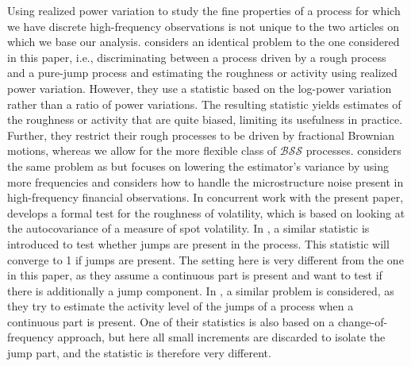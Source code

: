 \documentclass[fleqn,11pt,letterpaper]{article}
\theoremstyle{plain}
\theoremstyle{definition}
\theoremstyle{remark}
\numberwithin{equation}{section}
\begin{document}
Using realized power variation to study the fine properties of a process for which we have discrete high-frequency observations is not unique to the two articles on which we base our analysis. \cite{Woener2011} considers an identical problem to the one considered in this paper, i.e., discriminating between a process driven by a rough process and a pure-jump process and estimating the roughness or activity using realized power variation. However, they use a statistic based on the log-power variation rather than a ratio of power variations. The resulting statistic yields estimates of the roughness or activity that are quite biased, limiting its usefulness in practice. Further, they restrict their rough processes to be driven by fractional Brownian motions, whereas we allow for the more flexible class of $\mathcal{BSS}$ processes.%
\cite{Bennedsen2020} considers the same problem as \cite{Corcuera2013} but focuses on lowering the estimator's variance by using more frequencies and considers how to handle the microstructure noise present in high-frequency financial observations. In concurrent work with the present paper, \cite{ChongTodorov2023} develops a formal test for the roughness of volatility, which is based on looking at the autocovariance of a measure of spot volatility. In \cite{Ait-Sahalia2009}, a similar statistic is introduced to test whether jumps are present in the process. This statistic will converge to 1 if jumps are present. The setting here is very different from the one in this paper, as they assume a continuous part is present and want to test if there is additionally a jump component.  In \cite{Ait-Sahalia2009a}, a similar problem is considered, as they try to estimate the activity level of the jumps of a process when a continuous part is present. One of their statistics is also based on a change-of-frequency approach, but here all small increments are discarded to isolate the jump part, and the statistic is therefore very different. 
\end{document}
